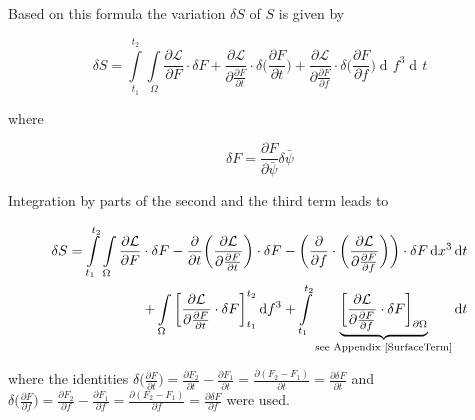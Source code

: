 \documentclass{article}
\DeclareMathOperator{\dd}{d\!}
\begin{document}
Based on this formula the variation $\delta S$ of $S$ is given by

\begin{equation}
\delta S = \int\limits_{t_1}^{t_2} \int\limits_{\Omega} 
\frac{\partial \mathcal{L}}{\partial F} \cdot \delta F
+ \frac{\partial \mathcal{L}}{\partial \frac{\partial F}{\partial t}} \cdot \delta \bigg(\frac{\partial F}{\partial t}\bigg)
+ \frac{\partial \mathcal{L}}{\partial \frac{\partial F}{\partial f}} \cdot \delta \bigg(\frac{\partial F} {\partial f}\bigg)
\dd f^3 \dd t
\end{equation}

where 

\begin{equation} \label{deltaFDefinition}
\delta F = \frac{\partial F}{\partial \bar{\psi}} \delta \bar{\psi}
\end{equation}


Integration by parts of the second and the third term leads to

\begin{equation} \label{calcDeltaSSection3}
\begin{split}
\delta S = \int\limits_{t_1}^{t_2} \int\limits_{\Omega} 
\frac{\partial \mathcal{L}}{\partial F} \cdot \delta F
-\frac{\partial}{\partial t} \bigg( \frac{\partial \mathcal{L}}{\partial \frac{\partial F}{\partial t}} \bigg) \cdot \delta F
-\bigg(\frac{\partial}{\partial f} \cdot \bigg( \frac{\partial \mathcal{L}}{\partial \frac{\partial F}{\partial f}} \bigg)\bigg) \cdot \delta F
\dd x^3 \dd t \\
+ \int\limits_{\Omega} \bigg[\frac{\partial \mathcal{L}}{\partial \frac{\partial F}{\partial t}} \cdot \delta F \bigg]_{t_1}^{t_2} \dd f^3
+ \int\limits_{t_1}^{t_2} 
\underbrace{
\bigg[\frac{\partial \mathcal{L}}{\partial \frac{\partial F}{\partial f}} \cdot \delta F \bigg]_{\partial \Omega} 
}_{\text{see Appendix \ref{SurfaceTerm}}}
\dd t
\end{split}
\end{equation}

where the identities $\delta \bigg(\frac{\partial F} {\partial t}\bigg) 
= \frac{\partial F_2} {\partial t} - \frac{\partial F_1} {\partial t}
= \frac{\partial (F_2 - F_1)} {\partial t}
= \frac{\partial \delta F} {\partial t}$ 
and
$\delta \bigg(\frac{\partial F} {\partial f}\bigg) 
= \frac{\partial F_2} {\partial f} - \frac{\partial F_1} {\partial f}
= \frac{\partial (F_2 - F_1)} {\partial f}
= \frac{\partial \delta F} {\partial f}$ 
were used. \\
\end{document}
